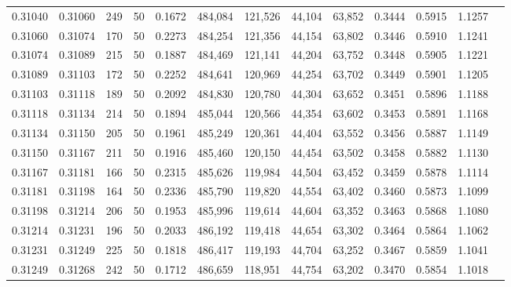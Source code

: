\begin{tabular}{rrrrrrrrrrrrr}
0.31040 & 0.31060 &   249 &  50 &                                     0.1672 & 484,084 & 121,526 &  44,104 &  63,852 & 0.3444 & 0.5915 & 1.1257 \\
0.31060 & 0.31074 &   170 &  50 &                                     0.2273 & 484,254 & 121,356 &  44,154 &  63,802 & 0.3446 & 0.5910 & 1.1241 \\
0.31074 & 0.31089 &   215 &  50 &                                     0.1887 & 484,469 & 121,141 &  44,204 &  63,752 & 0.3448 & 0.5905 & 1.1221 \\
0.31089 & 0.31103 &   172 &  50 &                                     0.2252 & 484,641 & 120,969 &  44,254 &  63,702 & 0.3449 & 0.5901 & 1.1205 \\
0.31103 & 0.31118 &   189 &  50 &                                     0.2092 & 484,830 & 120,780 &  44,304 &  63,652 & 0.3451 & 0.5896 & 1.1188 \\
0.31118 & 0.31134 &   214 &  50 &                                     0.1894 & 485,044 & 120,566 &  44,354 &  63,602 & 0.3453 & 0.5891 & 1.1168 \\
0.31134 & 0.31150 &   205 &  50 &                                     0.1961 & 485,249 & 120,361 &  44,404 &  63,552 & 0.3456 & 0.5887 & 1.1149 \\
0.31150 & 0.31167 &   211 &  50 &                                     0.1916 & 485,460 & 120,150 &  44,454 &  63,502 & 0.3458 & 0.5882 & 1.1130 \\
0.31167 & 0.31181 &   166 &  50 &                                     0.2315 & 485,626 & 119,984 &  44,504 &  63,452 & 0.3459 & 0.5878 & 1.1114 \\
0.31181 & 0.31198 &   164 &  50 &                                     0.2336 & 485,790 & 119,820 &  44,554 &  63,402 & 0.3460 & 0.5873 & 1.1099 \\
0.31198 & 0.31214 &   206 &  50 &                                     0.1953 & 485,996 & 119,614 &  44,604 &  63,352 & 0.3463 & 0.5868 & 1.1080 \\
0.31214 & 0.31231 &   196 &  50 &                                     0.2033 & 486,192 & 119,418 &  44,654 &  63,302 & 0.3464 & 0.5864 & 1.1062 \\
0.31231 & 0.31249 &   225 &  50 &                                     0.1818 & 486,417 & 119,193 &  44,704 &  63,252 & 0.3467 & 0.5859 & 1.1041 \\
0.31249 & 0.31268 &   242 &  50 &                                     0.1712 & 486,659 & 118,951 &  44,754 &  63,202 & 0.3470 & 0.5854 & 1.1018 \\

\end{tabular}
